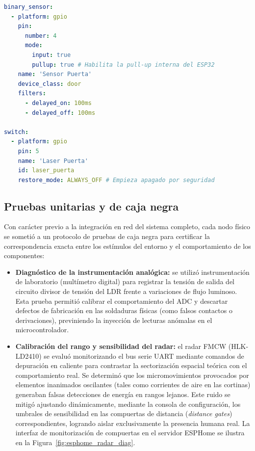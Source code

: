 \begin{itemize}
\begin{lstlisting}[language=YAML, caption={Fragmentos clave del firmware del Nodo Puerta en ESPHome.}, label={lst:esphome_puerta}]
binary_sensor:
  - platform: gpio
    pin:
      number: 4
      mode:
        input: true
        pullup: true # Habilita la pull-up interna del ESP32
    name: 'Sensor Puerta'
    device_class: door
    filters:
      - delayed_on: 100ms
      - delayed_off: 100ms

switch:
  - platform: gpio
    pin: 5
    name: 'Laser Puerta'
    id: laser_puerta
    restore_mode: ALWAYS_OFF # Empieza apagado por seguridad
\end{lstlisting}
\end{itemize}



\subsection{Pruebas unitarias y de caja negra}
\label{sec:pruebas_caja_negra}
Con carácter previo a la integración en red del sistema completo, cada nodo físico se sometió a un protocolo de pruebas de caja negra para certificar la correspondencia exacta entre los estímulos del entorno y el comportamiento de los componentes:
\begin{itemize}
    \item \textbf{Diagnóstico de la instrumentación analógica:} se utilizó instrumentación de laboratorio (multímetro digital) para registrar la tensión de salida del circuito divisor de tensión del LDR frente a variaciones de flujo luminoso. Esta prueba permitió calibrar el comportamiento del ADC y descartar defectos de fabricación en las soldaduras físicas (como falsos contactos o derivaciones), previniendo la inyección de lecturas anómalas en el microcontrolador.
    \item \textbf{Calibración del rango y sensibilidad del radar:} el radar FMCW (HLK-LD2410) se evaluó monitorizando el bus serie UART mediante comandos de depuración en caliente para contrastar la sectorización espacial teórica con el comportamiento real. Se determinó que los micromovimientos provocados por elementos inanimados oscilantes (tales como corrientes de aire en las cortinas) generaban falsas detecciones de energía en rangos lejanos. Este ruido se mitigó ajustando dinámicamente, mediante la consola de configuración, los umbrales de sensibilidad en las compuertas de distancia (\textit{distance gates}) correspondientes, logrando aislar exclusivamente la presencia humana real. La interfaz de monitorización de compuertas en el servidor ESPHome se ilustra en la Figura~\ref{fig:esphome_radar_diag}.
\end{itemize}

